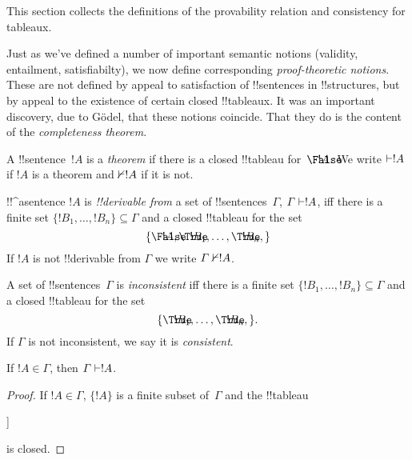 \documentclass[../../../include/open-logic-section]{subfiles}
\begin{document}

\begin{editorial}
This section collects the definitions of the provability relation
and consistency for tableaux.
\end{editorial}

\begin{explain}
Just as we've defined a number of important semantic notions
(validity, entailment, satisfiabilty), we now define corresponding
\emph{proof-theoretic notions}.  These are not defined by appeal to
satisfaction of !!{sentence}s in !!{structure}s, but by appeal to the
existence of certain closed !!{tableau}x.  It was an important
discovery, due to G\"odel, that these notions coincide.  That they do
is the content of the \emph{completeness theorem}.
\end{explain}


\begin{defn}[Theorems]
A !!{sentence}~$!A$ is a \emph{theorem} if there is a closed
!!{tableau} for~$\sFmla{\False}{!A}$.  We write $\Proves !A$ if $!A$
is a theorem and $\Proves/ !A$ if it is not.
\end{defn}

\begin{defn}[!!^{derivability}]
!!^a{sentence} $!A$ is \emph{!!{derivable} from} a set of
!!{sentence}s~$\Gamma$, $\Gamma \Proves !A$, iff there is a
finite set $\{!B_1, \dots, !B_n\} \subseteq \Gamma$
and a closed !!{tableau} for the set
\[
\{
  \sFmla{\False}{!A},
  \sFmla{\True}{!B_1}, \dots,
  \sFmla{\True}{!B_n},  
  \}
\]
If $!A$ is not !!{derivable} from $\Gamma$ we write $\Gamma \Proves/
!A$.
\end{defn}

\begin{defn}[Consistency]
A set of !!{sentence}s~$\Gamma$ is \emph{inconsistent} iff there is a
finite set $\{!B_1, \dots, !B_n\} \subseteq \Gamma$ and a closed
!!{tableau} for the set
\[
\{
  \sFmla{\True}{!B_1}, \dots,
  \sFmla{\True}{!B_n},  
  \}.
\]
If $\Gamma$ is not inconsistent, we say it is \emph{consistent}.
\end{defn}

\begin{prop}[Reflexivity]
If $!A \in \Gamma$, then $\Gamma \Proves !A$.
\end{prop}

\begin{proof}
If $!A \in \Gamma$, $\{!A\}$ is a finite subset of~$\Gamma$ and the !!{tableau}
\begin{oltableau}
  [\sFmla{\False}{\formula{A}}, just = \TAss
    [\sFmla{\True}{\formula{A}}, just = \TAss,close]
  ]
\end{oltableau}
is closed.
\end{proof}
  
\end{document}
